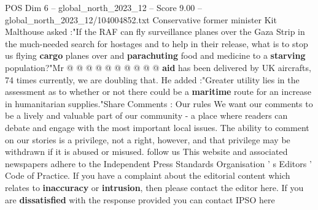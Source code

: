 \begin{textsample}{POS Dim 6 – global\_north\_2023\_12 – Score 9.00 – global\_north\_2023\_12/104004852.txt}
Conservative former minister Kit Malthouse asked :"If the RAF can fly surveillance planes over the Gaza Strip in the much-needed search for hostages and to help in their release, what is to stop us flying \textbf{cargo} planes over and \textbf{parachuting} food and medicine to a \textbf{starving} population?"Mr @ @ @ @ @ @ @ @ @ @ \textbf{aid} has been delivered by UK aircrafts, 74 times currently, we are doubling that.
He added :"Greater utility lies in the assessment as to whether or not there could be a \textbf{maritime} route for an increase in humanitarian supplies."Share Comments : Our rules We want our comments to be a lively and valuable part of our community - a place where readers can debate and engage with the most important local issues.
The ability to comment on our stories is a privilege, not a right, however, and that privilege may be withdrawn if it is abused or misused. follow us This website and associated newspapers adhere to the Independent Press Standards Organisation ' s Editors ' Code of Practice.
If you have a complaint about the editorial content which relates to \textbf{inaccuracy} or \textbf{intrusion}, then please contact the editor here.
If you are \textbf{dissatisfied} with the response provided you can contact IPSO here

\end{textsample}
